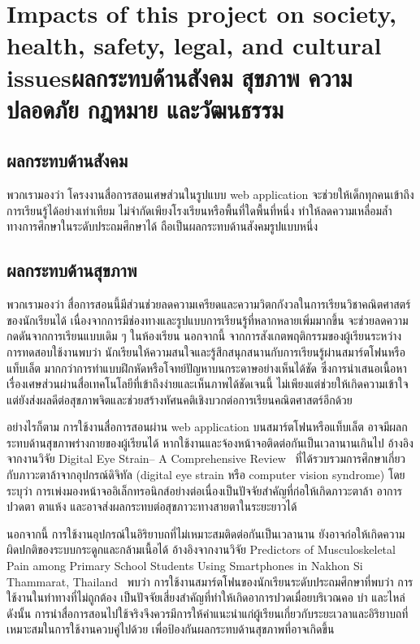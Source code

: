 \section{\ifenglish Impacts of this project on society, health, safety, legal, and cultural issues\else ผลกระทบด้านสังคม สุขภาพ ความปลอดภัย กฎหมาย และวัฒนธรรม\fi}

\subsection*{ผลกระทบด้านสังคม}
พวกเรามองว่า โครงงานสื่อการสอนเศษส่วนในรูปแบบ web application จะช่วยให้เด็กทุกคนเข้าถึงการเรียนรู้ได้อย่างเท่าเทียม 
ไม่จำกัดเพียงโรงเรียนหรือพื้นที่ใดพื้นที่หนึ่ง ทำให้ลดความเหลื่อมล้ำทางการศึกษาในระดับประถมศึกษาได้ ถือเป็นผลกระทบด้านสังคมรูปแบบหนึ่ง

\subsection*{ผลกระทบด้านสุขภาพ}
พวกเรามองว่า สื่อการสอนนี้มีส่วนช่วยลดความเครียดและความวิตกกังวลในการเรียนวิชาคณิตศาสตร์ของนักเรียนได้ เนื่องจากการมีช่องทางและรูปแบบการเรียนรู้ที่หลากหลายเพิ่มมากขึ้น 
จะช่วยลดความกดดันจากการเรียนแบบเดิม ๆ ในห้องเรียน นอกจากนี้ จากการสังเกตพฤติกรรมของผู้เรียนระหว่างการทดสอบใช้งานพบว่า 
นักเรียนให้ความสนใจและรู้สึกสนุกสนานกับการเรียนรู้ผ่านสมาร์ตโฟนหรือแท็บเล็ต มากกว่าการทำแบบฝึกหัดหรือโจทย์ปัญหาบนกระดาษอย่างเห็นได้ชัด 
ซึ่งการนำเสนอเนื้อหาเรื่องเศษส่วนผ่านสื่อเทคโนโลยีที่เข้าถึงง่ายและเห็นภาพได้ชัดเจนนี้ ไม่เพียงแต่ช่วยให้เกิดความเข้าใจ แต่ยังส่งผลดีต่อสุขภาพจิตและช่วยสร้างทัศนคติเชิงบวกต่อการเรียนคณิตศาสตร์อีกด้วย

อย่างไรก็ตาม การใช้งานสื่อการสอนผ่าน web application บนสมาร์ตโฟนหรือแท็บเล็ต อาจมีผลกระทบด้านสุขภาพร่างกายของผู้เรียนได้ หากใช้งานและจ้องหน้าจอติดต่อกันเป็นเวลานานเกินไป
อ้างอิงจากงานวิจัย Digital Eye Strain-- A Comprehensive Review~\cite{kaur_digital_eye_strain} ที่ได้รวบรวมการศึกษาเกี่ยวกับภาวะตาล้าจากอุปกรณ์ดิจิทัล (digital eye strain หรือ computer vision syndrome) 
โดยระบุว่า การเพ่งมองหน้าจออิเล็กทรอนิกส์อย่างต่อเนื่องเป็นปัจจัยสำคัญที่ก่อให้เกิดภาวะตาล้า อาการปวดตา ตาแห้ง และอาจส่งผลกระทบต่อสุขภาวะทางสายตาในระยะยาวได้ 

นอกจากนี้ การใช้งานอุปกรณ์ในอิริยาบถที่ไม่เหมาะสมติดต่อกันเป็นเวลานาน ยังอาจก่อให้เกิดความผิดปกติของระบบกระดูกและกล้ามเนื้อได้
อ้างอิงจากงานวิจัย Predictors of Musculoskeletal Pain among Primary School Students Using Smartphones in Nakhon Si Thammarat, Thailand~\cite{wu_spacious_environments}
พบว่า การใช้งานสมาร์ตโฟนของนักเรียนระดับประถมศึกษาที่พบว่า การใช้งานในท่าทางที่ไม่ถูกต้อง เป็นปัจจัยเสี่ยงสำคัญที่ทำให้เกิดอาการปวดเมื่อยบริเวณคอ บ่า และไหล่
ดังนั้น การนำสื่อการสอนไปใช้จริงจึงควรมีการให้คำแนะนำแก่ผู้เรียนเกี่ยวกับระยะเวลาและอิริยาบถที่เหมาะสมในการใช้งานควบคู่ไปด้วย เพื่อป้องกันผลกระทบด้านสุขภาพที่อาจเกิดขึ้น

